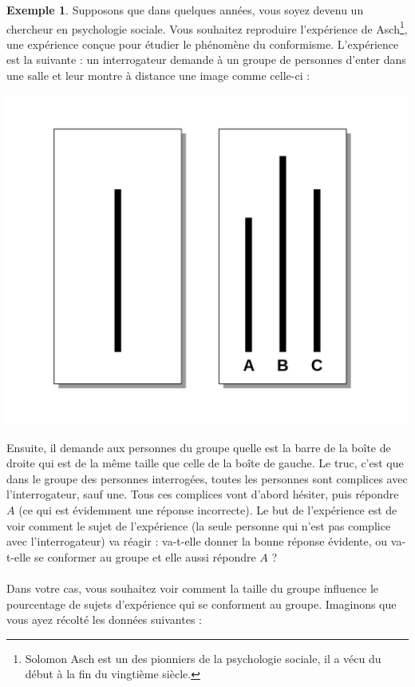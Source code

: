 \documentclass[a4paper,13pt]{scrreprt}
\theoremstyle{plain}
\theoremstyle{definition}
\newtheorem{exe}[subsection]{Exemple}
\begin{document}
\begin{exe} \label{exof10e}
	Supposons que dans quelques années, vous soyez devenu un chercheur en psychologie sociale. Vous souhaitez reproduire l'expérience de Asch\footnote{Solomon Asch est un des pionniers de la psychologie sociale, il a vécu du début à la fin du vingtième siècle.}, une expérience conçue pour étudier le phénomène du conformisme. L'expérience est la suivante : un interrogateur demande à un groupe de personnes d'enter dans une salle et leur montre à distance une image comme celle-ci :
	\begin{center}
	\includegraphics[scale=0.2]{Asch.PNG}
	\end{center}
	Ensuite, il demande aux personnes du groupe quelle est la barre de la boîte de droite qui est de la même taille que celle de la boîte de gauche. Le truc, c'est que dans le groupe des personnes interrogées, toutes les personnes sont complices avec l'interrogateur, sauf une. Tous ces complices vont d'abord hésiter, puis répondre $A$ (ce qui est évidemment une réponse incorrecte). Le but de l'expérience est de voir comment le sujet de l'expérience (la seule personne qui n'est pas complice avec l'interrogateur) va réagir : va-t-elle donner la bonne réponse évidente, ou va-t-elle se conformer au groupe et elle aussi répondre $A$ ? \\
	~~\\
	Dans votre cas, vous souhaitez voir comment la taille du groupe influence le pourcentage de sujets d'expérience qui se conforment au groupe. Imaginons que vous ayez récolté les données suivantes :

\end{exe}
\end{document}
